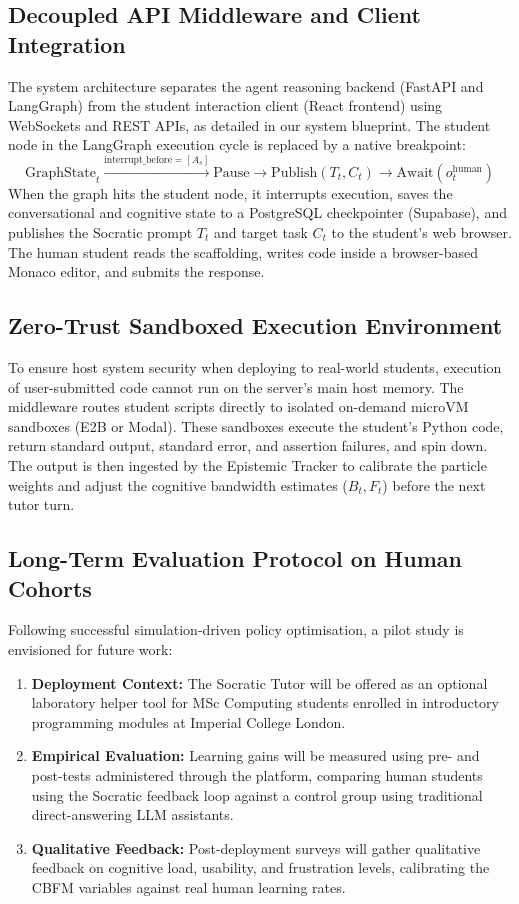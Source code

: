 \subsection{Decoupled API Middleware and Client Integration}
The system architecture separates the agent reasoning backend (FastAPI and LangGraph) from the student interaction client (React frontend) using WebSockets and REST APIs, as detailed in our system blueprint. The student node in the LangGraph execution cycle is replaced by a native breakpoint:
\begin{equation}
    \text{GraphState}_t \xrightarrow{\text{interrupt\_before} = [A_s]} \text{Pause} \to \text{Publish}(T_t, C_t) \to \text{Await}(o_t^{\text{human}})
\end{equation}
When the graph hits the student node, it interrupts execution, saves the conversational and cognitive state to a PostgreSQL checkpointer (Supabase), and publishes the Socratic prompt $T_t$ and target task $C_t$ to the student's web browser. The human student reads the scaffolding, writes code inside a browser-based Monaco editor, and submits the response.

\subsection{Zero-Trust Sandboxed Execution Environment}
To ensure host system security when deploying to real-world students, execution of user-submitted code cannot run on the server's main host memory. The middleware routes student scripts directly to isolated on-demand microVM sandboxes (E2B or Modal). These sandboxes execute the student's Python code, return standard output, standard error, and assertion failures, and spin down. The output is then ingested by the Epistemic Tracker to calibrate the particle weights and adjust the cognitive bandwidth estimates ($B_t, F_t$) before the next tutor turn.

\subsection{Long-Term Evaluation Protocol on Human Cohorts}
Following successful simulation-driven policy optimisation, a pilot study is envisioned for future work:
\begin{enumerate}
    \item \textbf{Deployment Context:} The Socratic Tutor will be offered as an optional laboratory helper tool for MSc Computing students enrolled in introductory programming modules at Imperial College London.
    \item \textbf{Empirical Evaluation:} Learning gains will be measured using pre- and post-tests administered through the platform, comparing human students using the Socratic feedback loop against a control group using traditional direct-answering LLM assistants.
    \item \textbf{Qualitative Feedback:} Post-deployment surveys will gather qualitative feedback on cognitive load, usability, and frustration levels, calibrating the CBFM variables against real human learning rates.
\end{enumerate}

